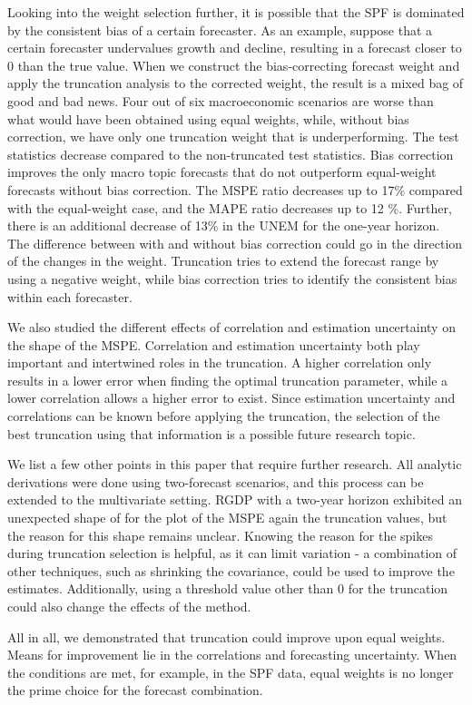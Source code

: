 \documentclass[11pt]{article}
\begin{document}
	Looking into the weight selection further, it is possible that the SPF is dominated by the consistent bias of a certain forecaster. As an example, suppose that a certain forecaster undervalues growth and decline, resulting in a forecast closer to 0 than the true value. When we construct the bias-correcting forecast weight and apply the truncation analysis to the corrected weight, the result is a mixed bag of good and bad news. Four out of six macroeconomic scenarios are worse than what would have been obtained using equal weights, while, without bias correction, we have only one truncation weight that is underperforming. The test statistics decrease compared to the non-truncated test statistics. Bias correction improves the only macro topic forecasts that do not outperform equal-weight forecasts without bias correction. The MSPE ratio decreases up to 17\% compared with the equal-weight case, and the MAPE ratio decreases up to 12 \%. Further, there is an additional decrease of 13\% in the UNEM for the one-year horizon. The difference between with and without bias correction could go in the direction of the changes in the weight. Truncation tries to extend the forecast range by using a negative weight, while bias correction tries to identify the consistent bias within each forecaster.
	
	We also studied the different effects of correlation and estimation uncertainty on the shape of the MSPE. Correlation and estimation uncertainty both play important and intertwined roles in the truncation. A higher correlation only results in a lower error when finding the optimal truncation parameter, while a lower correlation allows a higher error to exist. Since estimation uncertainty and correlations can be known before applying the truncation, the selection of the best truncation using that information is a possible future research topic.
	
	We list a few other points in this paper that require further research. All analytic derivations were done using two-forecast scenarios, and this process can be extended to the multivariate setting. RGDP with a two-year horizon exhibited an unexpected shape of for the plot of the MSPE again the truncation values, but the reason for this shape remains unclear. Knowing the reason for the spikes during truncation selection is helpful, as it can limit variation - a combination of other techniques, such as shrinking the covariance, could be used to improve the estimates. Additionally, using a threshold value other than 0 for the truncation could also change the effects of the method.
	
	All in all, we demonstrated that truncation could improve upon equal weights. Means for improvement lie in the correlations and forecasting uncertainty. When the conditions are met, for example, in the SPF data, equal weights is no longer the prime choice for the forecast combination. 
	
	\newpage
	
	
	
	
\end{document}
